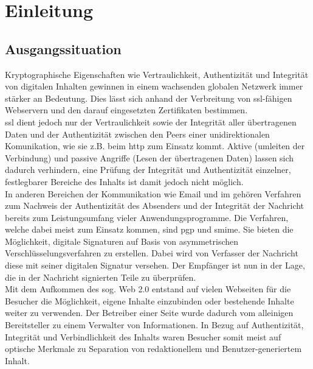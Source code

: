 
\chapter{Einleitung}
%
\label{chp:Einleitung}

\section{Ausgangssituation}
%
\label{sec:Einleitung:ausgangssituation}
Kryptographische Eigenschaften wie Vertraulichkeit, Authentizität und Integrität von digitalen Inhalten gewinnen in einem wachsenden globalen Netzwerk immer
stärker an Bedeutung. Dies lässt sich anhand der Verbreitung von \gls{ssl}-fähigen Webservern und den darauf eingesetzten Zertifikaten bestimmen\cite{ssliverse:eff}.\\

\gls{ssl} dient jedoch nur der Vertraulichkeit sowie der Integrität aller übertragenen Daten und der Authentizität zwischen den Peers einer unidirektionalen
Komunikation, wie sie z.B. beim \gls{http} zum Einsatz kommt\cite{}. Aktive (umleiten der Verbindung) und passive Angriffe (Lesen der übertragenen Daten) lassen sich dadurch
verhindern, eine Prüfung der Integrität und Authentizität einzelner, festlegbarer Bereiche des Inhalts ist damit jedoch nicht möglich.\\

In anderen Bereichen der Kommunikation wie Email und \gls{im} gehören Verfahren zum Nachweis der Authentizität des Absenders und der Integrität der Nachricht
bereits zum Leistungsumfang vieler Anwendungsprogramme\cite{}. Die Verfahren, welche dabei meist zum Einsatz kommen, sind \gls{pgp} und \gls{smime}. Sie bieten die
Möglichkeit, digitale Signaturen auf Basis von asymmetrischen Verschlüsselungsverfahren zu erstellen\cite{kits}. Dabei wird von Verfasser der Nachricht diese mit seiner
digitalen Signatur versehen. Der Empfänger ist nun in der Lage, die in der Nachricht signierten Teile zu überprüfen.\\

Mit dem Aufkommen des sog. Web 2.0 entstand auf vielen Webseiten für die Besucher die Möglichkeit, eigene Inhalte einzubinden oder bestehende Inhalte weiter zu
verwenden. Der Betreiber einer Seite wurde dadurch vom alleinigen Bereitsteller zu einem Verwalter von Informationen. In Bezug auf Authentizität, Integrität und
Verbindlichkeit des Inhalts waren Besucher somit meist auf optische Merkmale zu Separation von redaktionellem und Benutzer-generiertem Inhalt. \\

